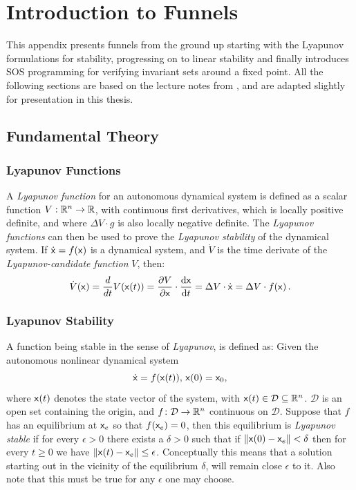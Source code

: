 \chapter{Introduction to Funnels}
\label{sec:first-app}

This appendix presents funnels from the ground up starting with the Lyapunov
formulations for stability, progressing on to linear stability and finally
introduces \ac{SOS} programming for verifying invariant sets around a fixed
point. All the following sections are based on the lecture notes from
\cite{tedrakeUnderactuatedRoboticsAlgorithms2019}, and are adapted slightly for
presentation in this thesis.

\section{Fundamental Theory}

\subsection{Lyapunov Functions}

A \textit{Lyapunov function} for an autonomous dynamical system is defined as a
scalar function \(V: \mathbb{R}^n \rightarrow \mathbb{R}\), with continuous first derivatives,
which is locally positive definite, and where \(\Delta V \cdot g\) is also
locally negative definite. The \textit{Lyapunov functions} can then be used to
prove the \textit{Lyapunov stability} of the dynamical system. If
\(\dot{{\mathbf{\mathsf{x}}}} = f({\mathbf{\mathsf{x}}})\) is a dynamical system, and \(\dot{V}\) is the
time derivate of the \textit{Lyapunov-candidate function} \(V\), then:
\[
  \dot{V}({\mathbf{\mathsf{x}}}) = \frac{d}{dt}V({\mathbf{\mathsf{x}}}(t)) = \frac{\partial V}{\partial
    {\mathbf{\mathsf{x}}}} \cdot \frac{\mathrm{d}{\mathbf{\mathsf{x}}}}{\mathrm{d}t} = \Delta V \cdot
  \dot{{\mathbf{\mathsf{x}}}} = \Delta V \cdot f({\mathbf{\mathsf{x}}}) \, .
\]

\subsection{Lyapunov Stability}

A function being stable in the sense of \textit{Lyapunov}, is defined as: Given
the autonomous nonlinear dynamical system
\[
  \dot{{\mathbf{\mathsf{x}}}} = f({\mathbf{\mathsf{x}}}(t)), \, {\mathbf{\mathsf{x}}}(0) = {\mathbf{\mathsf{x}}}_0,
\]
where \({\mathbf{\mathsf{x}}}(t)\) denotes the state vector of the system, with \({\mathbf{\mathsf{x}}}(t) \in
\mathcal{D} \subseteq \mathbb{R}^n\). \(\mathcal{D}\) is an open set containing the
origin, and \(f \colon \mathcal{D} \rightarrow \mathbb{R}^n\) continuous on
\(\mathcal{D}\). Suppose that \(f\) has an equilibrium at \({\mathbf{\mathsf{x}}}_e\) so that
\(f({\mathbf{\mathsf{x}}}_e) = 0\), then this equilibrium is \textit{Lyapunov stable} if for
every \(\epsilon > 0\) there exists a \(\delta > 0\) such that if \(\left \lVert
  {\mathbf{\mathsf{x}}}(0) - {\mathbf{\mathsf{x}}}_e \right \rVert < \delta\) then for every \(t \geq 0\)
we have \( \lVert {\mathbf{\mathsf{x}}}(t) - {\mathbf{\mathsf{x}}}_e \rVert \leq \epsilon\). Conceptually
this means that a solution starting out in the vicinity of the equilibrium
\(\delta\), will remain close \(\epsilon\) to it. Also note that this must be
true for any \(\epsilon\) one may choose.

